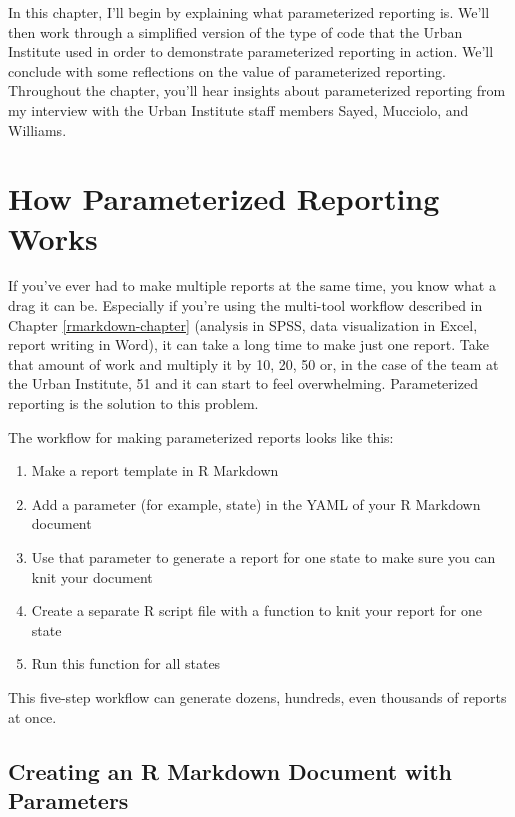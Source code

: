 \documentclass[
]{book}
\providecommand{\tightlist}{%
  \setlength{\itemsep}{0pt}\setlength{\parskip}{0pt}}
\begin{document}
In this chapter, I'll begin by explaining what parameterized reporting is. We'll then work through a simplified version of the type of code that the Urban Institute used in order to demonstrate parameterized reporting in action. We'll conclude with some reflections on the value of parameterized reporting. Throughout the chapter, you'll hear insights about parameterized reporting from my interview with the Urban Institute staff members Sayed, Mucciolo, and Williams.

\hypertarget{how-parameterized-reporting-works}{%
\section*{How Parameterized Reporting Works}\label{how-parameterized-reporting-works}}

If you've ever had to make multiple reports at the same time, you know what a drag it can be. Especially if you're using the multi-tool workflow described in Chapter \ref{rmarkdown-chapter} (analysis in SPSS, data visualization in Excel, report writing in Word), it can take a long time to make just one report. Take that amount of work and multiply it by 10, 20, 50 or, in the case of the team at the Urban Institute, 51 and it can start to feel overwhelming. Parameterized reporting is the solution to this problem.

The workflow for making parameterized reports looks like this:

\begin{enumerate}
\def\labelenumi{\arabic{enumi}.}
\tightlist
\item
  Make a report template in R Markdown
\item
  Add a parameter (for example, state) in the YAML of your R Markdown document
\item
  Use that parameter to generate a report for one state to make sure you can knit your document
\item
  Create a separate R script file with a function to knit your report for one state
\item
  Run this function for all states
\end{enumerate}

This five-step workflow can generate dozens, hundreds, even thousands of reports at once.

\hypertarget{creating-an-r-markdown-document-with-parameters}{%
\subsection*{Creating an R Markdown Document with Parameters}\label{creating-an-r-markdown-document-with-parameters}}
\end{document}
